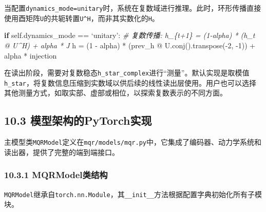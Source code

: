 \documentclass[
  12pt,
]{article}
\newenvironment{Shaded}{}{}
\newcommand{\CommentTok}[1]{\textcolor[rgb]{0.38,0.63,0.69}{\textit{#1}}}
\newcommand{\ControlFlowTok}[1]{\textcolor[rgb]{0.00,0.44,0.13}{\textbf{#1}}}
\newcommand{\DecValTok}[1]{\textcolor[rgb]{0.25,0.63,0.44}{#1}}
\newcommand{\NormalTok}[1]{#1}
\newcommand{\OperatorTok}[1]{\textcolor[rgb]{0.40,0.40,0.40}{#1}}
\newcommand{\VariableTok}[1]{\textcolor[rgb]{0.10,0.09,0.49}{#1}}
\begin{document}
当配置\texttt{dynamics\_mode=\textquotesingle{}unitary\textquotesingle{}}时，系统在复数域进行推理。此时，环形传播直接使用酉矩阵\texttt{U}的共轭转置\texttt{U\^{}H}，而非其实数化的\texttt{H}。

\begin{Shaded}
\begin{Highlighting}[]
\ControlFlowTok{if} \VariableTok{self}\NormalTok{.dynamics\_mode }\OperatorTok{==}\NormalTok{ ‘unitary’:}
    \CommentTok{\# 复数传播: h\_\{t+1\} = (1{-}alpha) * (h\_t @ U\^{}H) + alpha * J}
\NormalTok{    h }\OperatorTok{=}\NormalTok{ (}\DecValTok{1} \OperatorTok{{-}}\NormalTok{ alpha) }\OperatorTok{*}\NormalTok{ (prev\_h }\OperatorTok{@}\NormalTok{ U.conj().transpose(}\OperatorTok{{-}}\DecValTok{2}\NormalTok{, }\OperatorTok{{-}}\DecValTok{1}\NormalTok{)) }\OperatorTok{+}\NormalTok{ alpha }\OperatorTok{*}\NormalTok{ injection}
\end{Highlighting}
\end{Shaded}

在读出阶段，需要对复数稳态\texttt{h\_star\_complex}进行``测量''。默认实现是取模值\texttt{\textbar{}h\_star\textbar{}}，将复数信息压缩到实数域以供后续的线性读出层使用。用户也可以选择其他测量方式，如取实部、虚部或相位，以探索复数表示的不同方面。

\hypertarget{ux6a21ux578bux67b6ux6784ux7684pytorchux5b9eux73b0}{%
\subsection{10.3
模型架构的PyTorch实现}\label{ux6a21ux578bux67b6ux6784ux7684pytorchux5b9eux73b0}}

主模型类\texttt{MQRModel}定义在\texttt{mqr/models/mqr.py}中，它集成了编码器、动力学系统和读出器，提供了完整的端到端接口。

\hypertarget{mqrmodelux7c7bux7ed3ux6784}{%
\subsubsection{10.3.1 MQRModel类结构}\label{mqrmodelux7c7bux7ed3ux6784}}

\texttt{MQRModel}继承自\texttt{torch.nn.Module}，其\texttt{\_\_init\_\_}方法根据配置字典初始化所有子模块。
\end{document}
